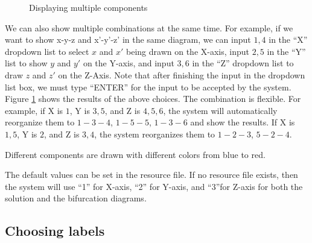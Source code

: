 \begin{figure}[!htmb]
\centering
{}
\caption{Displaying multiple components}
\label{fig:twoPairs}
\end{figure}

We can also show multiple combinations at the same time. For example, if we want 
to show x-y-z and x'-y'-z' in the same diagram, we can input $1,4$ in the ``X'' \textrm{dropdown list} to 
select $x$ and $x'$ being drawn on the X-axis, input $2,5$ in the ``Y'' list to show $y$ and $y'$ on the Y-axis,
and input $3,6$ in the ``Z'' \textrm{dropdown list} to draw $z$ and $z'$ on the Z-Axis. Note that after finishing 
the input in the \textrm{dropdown list} box, we must type ``ENTER'' for  
the input to be accepted by the system. Figure \ref{fig:twoPairs} shows the results of the above
choices. The combination is flexible. For example, if X is $1$, Y is $3, 5$, and Z is $4, 5, 6$, 
the system will automatically reorganize them to $1-3-4$, $1-5-5$, $1-3-6$ and show the results.
If X is $1, 5$,  Y is $2$, and Z is $3, 4$, the system reorganizes them to $1-2-3$, $5-2-4$.

Different components are drawn with different colors from blue to red. 

The default values can be set in the resource file. If no resource file exists, then the system
will use ``1'' for X-axis, ``2'' for Y-axis, and ``3''for Z-axis for both the solution and the bifurcation
diagrams.

\subsection{Choosing labels}

